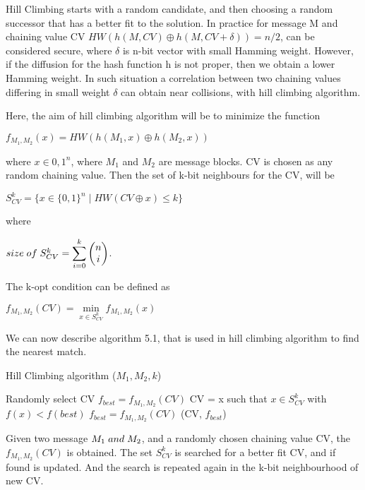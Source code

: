 Hill Climbing starts with a random candidate, and then choosing a random successor that has a better fit to the
solution. In practice for message M and chaining value CV $HW( h(M, CV) \oplus h(M, CV + \delta) ) = n / 2 $, can be considered
secure, where $\delta$ is n-bit vector with small Hamming weight. However, if the diffusion for the hash function h is 
not proper, then we obtain a lower Hamming weight. In such situation a correlation between two chaining values differing
in small weight $\delta$ can obtain near collisions, with hill climbing algorithm.

Here, the aim of hill climbing algorithm will be to minimize the function 

$f_{M_{1}, M_{2}}(x) = HW( h(M_{1}, x) \oplus h(M_{2}, x) )$

where $x \in {0, 1}^{n}$, where $M_{1}$ and $M_{2}$ are message blocks. CV is chosen as any random chaining value. Then the 
set of k-bit neighbours for the CV, will be 

$S^{k}_{CV} = \{ x \in \{0, 1\}^{n} \mid HW( CV \oplus x ) \leq k \}$

where 

$ size \thickspace of \thickspace S^{k}_{CV} = \displaystyle \sum \limits_{i = 0}^{k} \begin{pmatrix} n \\ i \end{pmatrix}$.

The k-opt condition can be defined as 

$f_{M_{1}, M_{2}} (CV) =  \min\limits_{x \in S^{k}_{CV}} f_{M_{1}, M_{2}} (x)$

We can now describe algorithm 5.1, that is used in hill climbing algorithm to find the nearest match. 

\begin{algorithm}
  \caption{ Hill Climbing algorithm ($M_{1}, M_{2}, k$) }
  \begin{algorithmic}[1]
    \State Randomly select CV
    \State $f_{best} = f_{M_{1}, M_{2}}(CV)$
    \State {}
    \State CV = x such that $x \in S^{k}_{CV}$ with $f(x) < f(best)$
    \State $f_{best} = f_{M_{1}, M_{2}}(CV)$
    \State \EndWhile
    \State \Return (CV, $f_{best}$)
  \end{algorithmic}
\end{algorithm}

Given two message $M_{1} \thickspace and \thickspace M_{2}$, and a randomly chosen chaining value CV, the $f_{M_{1}, M_{2}}(CV)$
is obtained. The set $S^{k}_{CV}$ is searched for a better fit CV, and if found is updated. And the search is repeated again
in the k-bit neighbourhood of new CV.

